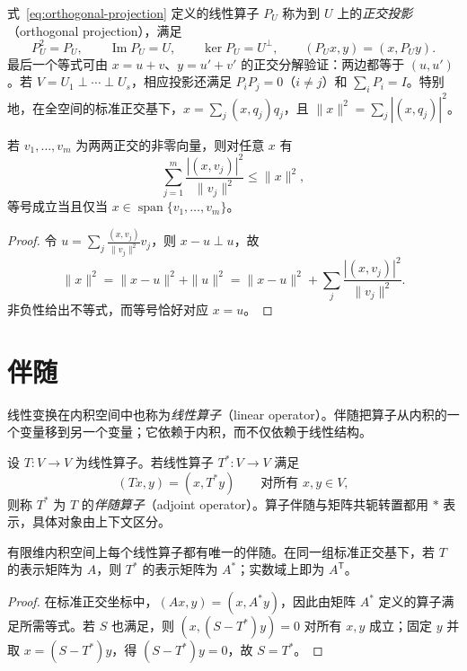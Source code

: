 式~\eqref{eq:orthogonal-projection} 定义的线性算子 $P_U$ 称为到 $U$ 上的\emph{正交投影}（orthogonal projection），满足
\[
    P_U^2=P_U,\qquad \operatorname{Im}P_U=U,\qquad
    \ker P_U=U^\perp,\qquad (P_Ux,y)=(x,P_Uy).
\]
最后一个等式可由 $x=u+v$、$y=u'+v'$ 的正交分解验证：两边都等于 $(u,u')$。若 $V=U_1\mathbin\perp\cdots\mathbin\perp U_s$，相应投影还满足 $P_iP_j=0$（$i\ne j$）和 $\sum_iP_i=I$。特别地，在全空间的标准正交基下，$x=\sum_j(x,q_j)q_j$，且 $\|x\|^2=\sum_j|(x,q_j)|^2$。

\begin{proposition}
\label{prop:bessel}
若 $v_1,\ldots,v_m$ 为两两正交的非零向量，则对任意 $x$ 有
\[
    \sum_{j=1}^m\frac{|(x,v_j)|^2}{\|v_j\|^2}\leq\|x\|^2,
\]
等号成立当且仅当 $x\in\operatorname{span}\{v_1,\ldots,v_m\}$。
\end{proposition}
\begin{proof}
令 $u=\sum_j\frac{(x,v_j)}{\|v_j\|^2}v_j$，则 $x-u\perp u$，故
\[
    \|x\|^2=\|x-u\|^2+\|u\|^2
    =\|x-u\|^2+\sum_j\frac{|(x,v_j)|^2}{\|v_j\|^2}.
\]
非负性给出不等式，而等号恰好对应 $x=u$。
\end{proof}

\section{伴随}
\label{sec:adjoint-operator}

线性变换在内积空间中也称为\emph{线性算子}（linear operator）。伴随把算子从内积的一个变量移到另一个变量；它依赖于内积，而不仅依赖于线性结构。

\begin{definition}
设 $T:V\to V$ 为线性算子。若线性算子 $T^*:V\to V$ 满足
\begin{equation}
\label{eq:adjoint-definition}
    (Tx,y)=(x,T^*y)\qquad\text{对所有 }x,y\in V,
\end{equation}
则称 $T^*$ 为 $T$ 的\emph{伴随算子}（adjoint operator）。算子伴随与矩阵共轭转置都用 $*$ 表示，具体对象由上下文区分。
\end{definition}

\begin{theorem}
\label{thm:adjoint-existence}
有限维内积空间上每个线性算子都有唯一的伴随。在同一组标准正交基下，若 $T$ 的表示矩阵为 $A$，则 $T^*$ 的表示矩阵为 $A^*$；实数域上即为 $A^{\mathsf T}$。
\end{theorem}
\begin{proof}
在标准正交坐标中，$(Ax,y)=(x,A^*y)$，因此由矩阵 $A^*$ 定义的算子满足所需等式。若 $S$ 也满足，则 $(x,(S-T^*)y)=0$ 对所有 $x,y$ 成立；固定 $y$ 并取 $x=(S-T^*)y$，得 $(S-T^*)y=0$，故 $S=T^*$。
\end{proof}

